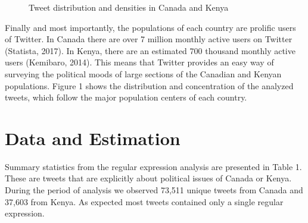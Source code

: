 \documentclass[12pt]{article}
\begin{document}
\begin{spacing}{1.5}
\begin{figure}[htb]
\centering 
{}
\caption{Tweet distribution and densities in Canada and Kenya}
\end{figure}

Finally and most importantly, the populations of each country are prolific users of Twitter. In Canada there are over 7 million monthly active users on Twitter (Statista, 2017). In Kenya, there are an estimated 700 thousand monthly active users (Kemibaro, 2014). This means that Twitter provides an easy way of surveying the political moods of large sections of the Canadian and Kenyan populations. Figure 1 shows the distribution and concentration of the analyzed tweets, which follow the major population centers of each country. 





\section*{Data and Estimation}   

Summary statistics from the regular expression analysis are presented in Table 1. These are tweets that are explicitly about political issues of Canada or Kenya. During the period of analysis we observed 73,511 unique tweets from Canada and 37,603 from Kenya. As expected most tweets contained only a single regular expression. 


\end{spacing}
\end{document}
